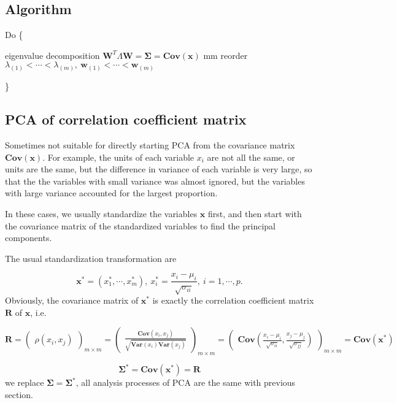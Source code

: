 \subsection{Algorithm}

Do \{

	\qquad eigenvalue decomposition $\mathbf{W}^T\Lambda\mathbf{W} = \mathbf{\Sigma} = \mathbf{Cov(x)}$
	 mm
	\qquad reorder $\lambda_{(1)}<\cdots<\lambda_{(m)},~\mathbf{w}_{(1)}<\cdots<\mathbf{w}_{(m)}$

\}

\subsection{PCA of correlation coefficient matrix}
Sometimes not suitable for directly starting PCA from the covariance matrix $\mathbf{Cov(x)}$. For example, the units of each variable $x_i$ are not all the same, or units are the same, but the difference in variance of each variable is very large, so that the the variables with small variance was almost  ignored, but the variables with large variance accounted for the largest proportion.

In these cases, we usually standardize the variables $\mathbf{x}$ first, and then start with the covariance matrix of the standardized variables to find the principal components.

The usual standardization transformation are

\[
	\mathbf{x}^* = (x_1^*,\cdots,x_m^*),~x_i^* = \frac{x_i - \mu_i}{\sqrt{\sigma_{ii}}},~i = 1,\cdots,p.
\]
Obviously, the covariance matrix of $\mathbf{x}^*$ is exactly the correlation coefficient matrix $\mathbf{R}$ of $\mathbf{x}$, i.e.
\begin{tiny}
\[	
	\mathbf{R} =
	\begin{pmatrix}
		\rho(x_i,x_j)
	\end{pmatrix}
	_{m\times m}
	= 	
	\begin{pmatrix}
		\frac{\mathbf{Cov}(x_i,x_j)}{\sqrt{\mathbf{Var}(x_i)\mathbf{Var}(x_j)}}
	\end{pmatrix}
	_{m\times m}
	= 	
	\begin{pmatrix}
		\mathbf{Cov}\left(\frac{x_i-\mu_i}{\sqrt{\sigma_{ii}}},\frac{x_j-\mu_j}{\sqrt{\sigma_{jj}}}\right)
	\end{pmatrix}
	_{m\times m}
	=
	\mathbf{Cov}(\mathbf{x^*})
\]
\end{tiny}
\[
	\mathbf{\Sigma}^* = \mathbf{Cov}(\mathbf{x^*}) = \mathbf{R}
\]
we replace $\mathbf{\Sigma}=\mathbf{\Sigma}^*$, all analysis processes of PCA are the same with previous section.

 